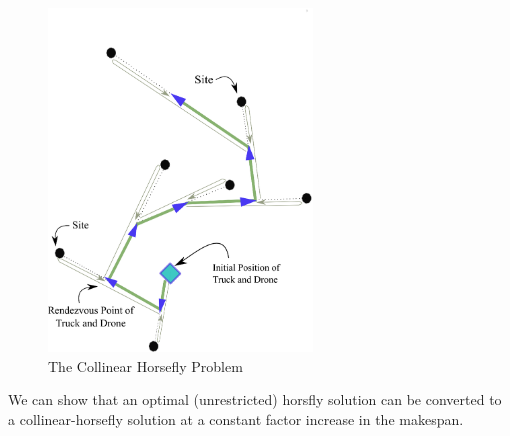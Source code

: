 \documentclass[11.5pt]{report}
\begin{document}
\begin{figure}[H]
\centering
    \includegraphics[width=7cm]{../webs/docs/collinear_horseflies.eps}
    \caption{The Collinear Horsefly Problem}
    \label{fig:collinear-horseflies}
\end{figure}

We can show that an optimal (unrestricted) horsfly solution can be converted
to a collinear-horsefly solution at a constant factor increase in the makespan. 
\end{document}
